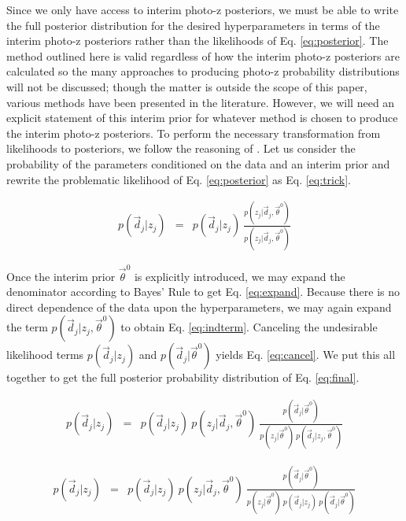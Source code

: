 \documentclass[preprint]{aastex}
\begin{document}
Since we only have access to interim photo-z posteriors, we must be able to 
write the full posterior distribution for the desired hyperparameters in terms 
of the interim photo-z posteriors rather than the likelihoods of Eq. 
\ref{eq:posterior}.  The method outlined here is valid regardless of how the 
interim photo-z posteriors are calculated so the many approaches to producing 
photo-z probability distributions will not be discussed; though the matter is 
outside the scope of this paper, various methods have been presented in the 
literature. \citep{Sheldon2012, Ball2008, CarrascoKind2013, CarrascoKind2014a}  
However, we will need an explicit statement of this interim prior for whatever 
method is chosen to produce the interim photo-z posteriors.  To perform the 
necessary transformation from likelihoods to posteriors, we follow the 
reasoning of \citet{Marshall2015}.  Let us consider the probability of the 
parameters conditioned on the data and an interim prior and rewrite the 
problematic likelihood of Eq. \ref{eq:posterior} as Eq. \ref{eq:trick}.  

\begin{eqnarray}
\label{eq:trick}
p(\vec{d}_{j}|z_{j}) &=& p(\vec{d}_{j}|z_{j})\ 
\frac{p(z_{j}|\vec{d}_{j},\vec{\theta}^{0})}{p(z_{j}|\vec{d}_{j},\vec{\theta}^{0
})}
\end{eqnarray}

Once the interim prior $\vec{\theta}^{0}$ is explicitly introduced, we may 
expand the denominator according to Bayes' Rule to get Eq. \ref{eq:expand}.  
Because there is no direct dependence of the data upon the hyperparameters, we 
may again expand the term $p(\vec{d}_{j}|z_{j},\vec{\theta}^{0})$ to obtain Eq. 
\ref{eq:indterm}.  Canceling the undesirable likelihood terms 
$p(\vec{d}_{j}|z_{j})$ and $p(\vec{d}_{j}|\vec{\theta}^{0})$ yields Eq. 
\ref{eq:cancel}.  We put this all together to get the full posterior 
probability distribution of Eq. \ref{eq:final}.

\begin{eqnarray}
\label{eq:expand}
p(\vec{d}_{j}|z_{j}) &=& p(\vec{d}_{j}|z_{j})\ 
p(z_{j}|\vec{d}_{j},\vec{\theta}^{0})\ 
\frac{p(\vec{d}_{j}|\vec{\theta}^{0})}{p(z_{j}|\vec{\theta}^{0})\ 
p(\vec{d}_{j}|z_{j},\vec{\theta}^{0})}
\end{eqnarray}

\begin{eqnarray}
\label{eq:indterm}
p(\vec{d}_{j}|z_{j}) &=& p(\vec{d}_{j}|z_{j})\ 
p(z_{j}|\vec{d}_{j},\vec{\theta}^{0})\ 
\frac{p(\vec{d}_{j}|\vec{\theta}^{0})}{p(z_{j}|\vec{\theta}^{0})\ 
p(\vec{d}_{j}|z_{j})\ p(\vec{d}_{j}|\vec{\theta}^{0})}
\end{eqnarray}
\end{document}
